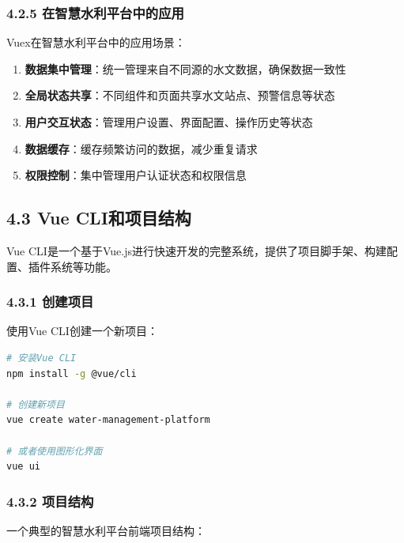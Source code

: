 \subsubsection{4.2.5
在智慧水利平台中的应用}\label{ux5728ux667aux6167ux6c34ux5229ux5e73ux53f0ux4e2dux7684ux5e94ux7528-1}

Vuex在智慧水利平台中的应用场景：

\begin{enumerate}
\def\labelenumi{\arabic{enumi}.}
\tightlist
\item
  \textbf{数据集中管理}：统一管理来自不同源的水文数据，确保数据一致性
\item
  \textbf{全局状态共享}：不同组件和页面共享水文站点、预警信息等状态
\item
  \textbf{用户交互状态}：管理用户设置、界面配置、操作历史等状态
\item
  \textbf{数据缓存}：缓存频繁访问的数据，减少重复请求
\item
  \textbf{权限控制}：集中管理用户认证状态和权限信息
\end{enumerate}

\subsection{4.3 Vue
CLI和项目结构}\label{vue-cliux548cux9879ux76eeux7ed3ux6784}

Vue
CLI是一个基于Vue.js进行快速开发的完整系统，提供了项目脚手架、构建配置、插件系统等功能。

\subsubsection{4.3.1 创建项目}\label{ux521bux5efaux9879ux76ee}

使用Vue CLI创建一个新项目：

\begin{lstlisting}[language=bash]
# 安装Vue CLI
npm install -g @vue/cli

# 创建新项目
vue create water-management-platform

# 或者使用图形化界面
vue ui
\end{lstlisting}

\subsubsection{4.3.2 项目结构}\label{ux9879ux76eeux7ed3ux6784-1}

一个典型的智慧水利平台前端项目结构：

